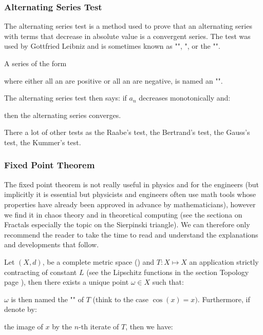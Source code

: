 	\subsubsection{Alternating Series Test}
	The alternating series test is a method used to prove that an alternating series with terms that decrease in absolute value is a convergent series. The test was used by Gottfried Leibniz and is sometimes known as "", ", or the "".
	
	A series of the form
	
	where either all an are positive or all an are negative, is named an "".

	The alternating series test then says: if $a_n$ decreases monotonically and:
	
 	then the alternating series converges.
	
	There a lot of other tests as the Raabe's test, the Bertrand's test, the Gauss's test, the Kummer's test.
	
	\subsubsection{Fixed Point Theorem}\label{fixed point theorem}
	The fixed point theorem is not really useful in physics and for the engineers (but implicitly it is essential but physicists and engineers often use math tools whose properties have already been approved in advance by mathematicians), however we find it in chaos theory and in theoretical computing (see the sectiona on Fractals especially the topic on the Sierpinski triangle). We can therefore only recommend the reader to take the time to read and understand the explanations and developments that follow.
	
	Let $(X,d)$, be a complete metric space () and $T:X\mapsto X$ an application strictly contracting of constant $L$ (see the Lipschitz functions in the section Topology page \pageref{lipschitz functions}), then there exists a unique point $\omega\in X$ such that:
	
	$\omega$ is then named the "" of $T$ (think to the case $\cos(x)=x)$. Furthermore, if denote by:
	
	the image of $x$ by the $n$-th iterate of $T$, then we have:
	
